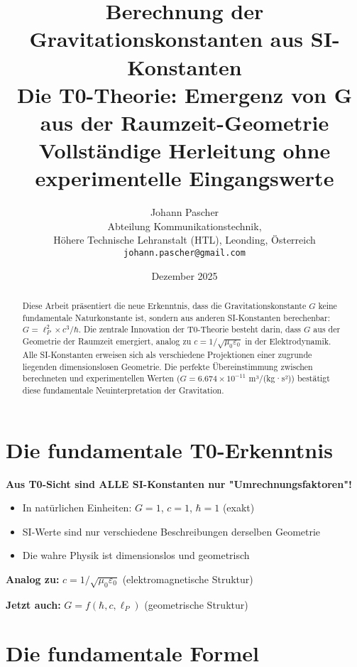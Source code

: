 \documentclass[12pt,a4paper]{article}
\title{\textbf{Berechnung der Gravitationskonstanten aus SI-Konstanten}\\[0.5cm]
	\large Die T0-Theorie: Emergenz von G aus der Raumzeit-Geometrie\\[0.3cm]
	\normalsize Vollständige Herleitung ohne experimentelle Eingangswerte}
\author{Johann Pascher\\
	\small Abteilung Kommunikationstechnik,\\
	\small Höhere Technische Lehranstalt (HTL), Leonding, Österreich\\
	\small \texttt{johann.pascher@gmail.com}}
\date{Dezember 2025}
\theoremstyle{definition}
\begin{document}
	
	\maketitle
	
	\begin{abstract}
		Diese Arbeit präsentiert die neue Erkenntnis, dass die Gravitationskonstante $G$ keine fundamentale Naturkonstante ist, sondern aus anderen SI-Konstanten berechenbar: $G = \ell_P^2 \times c^3 / \hbar$. Die zentrale Innovation der T0-Theorie besteht darin, dass $G$ aus der Geometrie der Raumzeit emergiert, analog zu $c = 1/\sqrt{\mu_0\varepsilon_0}$ in der Elektrodynamik. Alle SI-Konstanten erweisen sich als verschiedene Projektionen einer zugrunde liegenden dimensionslosen Geometrie. Die perfekte Übereinstimmung zwischen berechneten und experimentellen Werten ($G = 6.674 \times 10^{-11}$ m³/(kg·s²)) bestätigt diese fundamentale Neuinterpretation der Gravitation.
	\end{abstract}
	
	\tableofcontents
	\newpage
	
	\section{Die fundamentale T0-Erkenntnis}
	
	\begin{revolution}
		\textbf{Aus T0-Sicht sind ALLE SI-Konstanten nur "Umrechnungsfaktoren"!}
		
		\begin{itemize}
			\item In natürlichen Einheiten: $G = 1$, $c = 1$, $\hbar = 1$ (exakt)
			\item SI-Werte sind nur verschiedene Beschreibungen derselben Geometrie
			\item Die wahre Physik ist dimensionslos und geometrisch
		\end{itemize}
		
		\textbf{Analog zu:} $c = 1/\sqrt{\mu_0\varepsilon_0}$ (elektromagnetische Struktur)
		
		\textbf{Jetzt auch:} $G = f(\hbar, c, \ell_P)$ (geometrische Struktur)
	\end{revolution}
	
	\section{Die fundamentale Formel}
	
\end{document}
